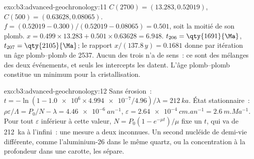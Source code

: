 \begin{solution}{exo:b3:advanced-geochronology:11}
$C(2700) = (13.283, 0.52019)$, $C(500) = (0.63628, 0.08065)$. $f = (0.52019 -
0.300)/(0.52019 - 0.08065) = 0.501$, soit la moitié de son plomb. $x = 0.499\times13.283 +
0.501\times0.63628 = 6.948$. $t_{206} = \qty{1691}{\Ma}$, $t_{207} =
\qty{2105}{\Ma}$; le rapport $x/(137.8\,y) = 0.1681$ donne par itération un
âge plomb--plomb de \qty{2537}{\Ma}. Aucun des trois n'a de sens~: ce sont
des mélanges des deux événements, et seuls les intercepts les datent. L'âge
plomb--plomb constitue un minimum pour la cristallisation.
\end{solution}

\begin{solution}{exo:b3:advanced-geochronology:12}
Sans érosion~: $t = -\ln(1 - \num{1.0e6}\times\num{4.994e-7}/4.96)/\lambda =
\qty{212}{ka}$. État stationnaire~: $\rho\varepsilon/\Lambda = P_0/N - \lambda =
\qty{4.46e-6}{an^{-1}}$, $\varepsilon = \qty{2.64e-4}{cm.an^{-1}} =
\qty{2.6}{m.Ma^{-1}}$. Pour tout $\varepsilon$ inférieur à cette valeur, $N =
P_0(1 - e^{-\mu t})/\mu$ fixe un $t$, qui va de \qty{212}{ka} à
l'infini~: une mesure a deux inconnues. Un second nucléide de demi-vie
différente, comme l'aluminium-26 dans le même quartz, ou la concentration à
la profondeur dans une carotte, les sépare.
\end{solution}


